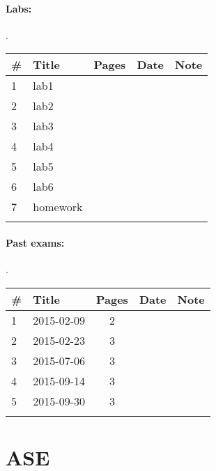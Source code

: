 \documentclass[a4paper,12pt]{article} %
\begin{document}
\paragraph{Labs:}.\\
\begin{tabularx}{\textwidth}{|l|X|c|l|c|}
	\hline
	\# & Title & Pages & Date & Note \\
	\hline
	1 & lab1 &  &  &  \\
	\hline
	2 & lab2 &  &  &  \\
	\hline
	3 & lab3 &  &  &  \\
	\hline
	4 & lab4 &  &  &  \\
	\hline
	5 & lab5 &  &  &  \\
	\hline
	6 & lab6 &  &  &  \\
	\hline
	7 & homework &  &  &  \\
	\hline
	&  &  &  &  \\
	\hline
\end{tabularx}

\paragraph{Past exams:}.\\
\begin{tabularx}{\textwidth}{|l|X|c|l|c|}
	\hline
	\# & Title & Pages & Date & Note \\
	\hline
	1 & 2015-02-09 & 2 &  &  \\
	\hline
	2 & 2015-02-23 & 3 &  &  \\
	\hline
	3 & 2015-07-06 & 3 &  &  \\
	\hline
	4 & 2015-09-14 & 3 &  &  \\
	\hline
	5 & 2015-09-30 & 3 &  &  \\
	\hline
	&  &  &  &  \\
	\hline
\end{tabularx}

\newpage
\section{ASE}
\end{document}
